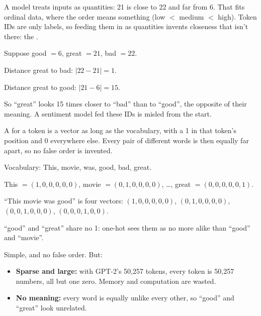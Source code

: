 \begin{definition}
A model treats inputs as quantities: 21 is close to 22 and far from 6. That fits ordinal data, where the order means something (low $<$ medium $<$ high). Token IDs are only labels, so feeding them in as quantities invents closeness that isn't there: the .
\end{definition}

\begin{example}
Suppose good $= 6$, great $= 21$, bad $= 22$.
\begin{steps}
  \item Distance great to bad: $|22 - 21| = 1$.
  \item Distance great to good: $|21 - 6| = 15$.
  \item So ``great'' looks 15 times closer to ``bad'' than to ``good'', the opposite of their meaning. A sentiment model fed these IDs is misled from the start.
\end{steps}
\end{example}

\begin{definition}
A  for a token is a vector as long as the vocabulary, with a 1 in that token's position and 0 everywhere else. Every pair of different words is then equally far apart, so no false order is invented.
\end{definition}

\begin{example}
Vocabulary: This, movie, was, good, bad, great.
\begin{steps}
  \item This $= (1,0,0,0,0,0)$, movie $= (0,1,0,0,0,0)$, \dots, great $= (0,0,0,0,0,1)$.
  \item ``This movie was good'' is four vectors: $(1,0,0,0,0,0)$, $(0,1,0,0,0,0)$, $(0,0,1,0,0,0)$, $(0,0,0,1,0,0)$.
  \item ``good'' and ``great'' share no 1: one-hot sees them as no more alike than ``good'' and ``movie''.
\end{steps}
\end{example}

\begin{result}
Simple, and no false order. But:
\begin{itemize}
  \item \textbf{Sparse and large:} with GPT-2's 50,257 tokens, every token is 50,257 numbers, all but one zero. Memory and computation are wasted.
  \item \textbf{No meaning:} every word is equally unlike every other, so ``good'' and ``great'' look unrelated.
\end{itemize}
\end{result}


